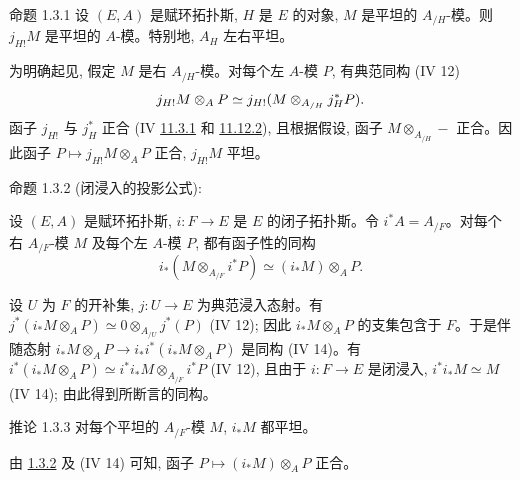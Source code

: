 \begin{enonce*}{命题 1.3.1}
设 $(E,A)$ 是赋环拓扑斯, $H$ 是 $E$ 的对象, $M$ 是平坦的 $A_{/H}$-模。则 $j_{H!}M$ 是平坦的 $A$-模。特别地, $A_H$ 左右平坦。
\end{enonce*}

为明确起见, 假定 $M$ 是右 $A_{/H}$-模。对每个左 $A$-模 $P$, 有典范同构 (IV 12) %
$$
j_{H!}M\otimes_A P\simeq
j_{H!}(M\otimes_{A_{/H}}j_H^{\ast}P){}.
$$
函子 $j_{H!}$ 与 $j_H^{\ast}$ 正合 (IV \hyperref[IV.prop11.3.1]{11.3.1} 和 \hyperref[IV.subsubsec11.2.2]{11.12.2}), 且根据假设, 函子 $M\otimes_{A_{/H}}-$ 正合。因此函子 $P\longmapsto j_{H!}M\otimes_A P$ 正合, $j_{H!}M$ 平坦。

\begin{enonce*}{命题 1.3.2}
(闭浸入的投影公式):

设 $(E,A)$ 是赋环拓扑斯, $i:F\to E$ 是 $E$ 的闭子拓扑斯。令 $i^{\ast}A=A_{/F}$。对每个右 $A_{/F}$-模 $M$ 及每个左 $A$-模 $P$, 都有\pageoriginale 函子性的同构
$$
i_\ast(M\otimes_{A_{/F}}i^\ast P)\simeq(i_\ast M)\otimes_A P.
$$
\end{enonce*}

设 $U$ 为 $F$ 的开补集, $j:U\to E$ 为典范浸入态射。有 $j^{\ast}(i_\ast M\otimes_A P)\simeq
0\otimes_{A_{/U}}j^\ast(P)$ (IV 12); 因此 $i_\ast M\otimes_A P$ 的支集包含于 $F$。于是伴随态射 $i_\ast M\otimes_A P\to i_\ast i^\ast(i_\ast M\otimes_A P)$ 是同构 (IV 14)。有 $i^{\ast}(i_\ast M\otimes_A P)\simeq
i^\ast i_\ast M\otimes_{A_{/F}}i^\ast P$ (IV 12), 且由于 $i:F\to E$ 是闭浸入, $i^{\ast}i_\ast M\simeq M$ (IV 14); 由此得到所断言的同构。

\begin{enonce*}{推论 1.3.3}
对每个平坦的 $A_{/F}$-模 $M$, $i_\ast M$ 都平坦。
\end{enonce*}

由 \hyperref[V.prop1.3.2]{1.3.2} 及 (IV 14) 可知, 函子 $P\longmapsto(i_\ast M)\otimes_A P$ 正合。

\setcounter{subsection}{3}
